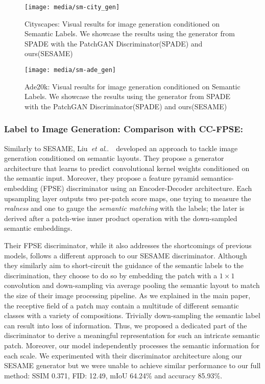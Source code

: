 \documentclass[runningheads]{llncs}
\makeatletter
\DeclareRobustCommand\onedot{\futurelet\@let@token\@onedot}
\def\@onedot{\ifx\@let@token.\else.\null\fi\xspace}
\def\etal{\emph{et al}\onedot}
\def\liu{Liu~\etal~\cite{liu2019learning}\ }
\makeatother
\begin{document}
\begin{figure}[]
\begin{center}
    \centering
    \texttt{[image: media/sm-city\_gen]}
    \caption{Cityscapes\cite{Cordts_2016_CVPR}: Visual results for image generation conditioned on Semantic Labels. We showcase the results using the generator from SPADE\cite{park2019SPADE} with the PatchGAN Discriminator(SPADE) and ours(SESAME)}
    \label{fig:city_gen}
\end{center}
\end{figure}

\begin{figure}[]
\begin{center}
    \centering
    \texttt{[image: media/sm-ade\_gen]}
    \caption{Ade20k\cite{zhou2017scene,zhou2016semantic}: Visual results for image generation conditioned on Semantic Labels. We showcase the results using the generator from SPADE\cite{park2019SPADE} with the PatchGAN Discriminator(SPADE) and ours(SESAME)}
    \label{fig:ade_gen}
\end{center}
\end{figure}

\subsubsection{Label to Image Generation: Comparison with CC-FPSE:}

Similarly to SESAME, \liu developed an approach to tackle image generation conditioned on semantic layouts.
They propose a generator architecture that learns to predict convolutional kernel weights conditioned on the semantic input.
Moreover, they propose a feature pyramid semantics-embedding (FPSE) discriminator using an Encoder-Decoder architecture. Each upsampling layer outputs two per-patch score maps, one trying to measure the \textit{realness} and one to gauge the \textit{semantic matching} with the labels; the later is derived after a patch-wise inner product operation with the down-sampled semantic embeddings. 

Their FPSE discriminator, while it also addresses the shortcomings of previous models, follows a different approach to our SESAME discriminator.
Although they similarly aim to short-circuit the guidance of the semantic labels to the discrimination, they choose to do so by embedding the patch with a $1\times1$ convolution and down-sampling via average pooling the semantic layout to match the size of their image processing pipeline.
As we explained in the main paper, the receptive field of a patch may contain a multitude of different semantic classes with a variety of compositions.
Trivially down-sampling the semantic label can result into loss of information.
Thus, we proposed a dedicated part of the discriminator to derive a meaningful representation for such an intricate semantic patch.
Moreover, our model independently processes the semantic information for each scale. 
 We experimented with their discriminator architecture along our SESAME generator but we were unable to achieve similar performance to our full method: SSIM 0.371, FID: 12.49, mIoU 64.24\% and accuracy 85.93\%.
\end{document}
